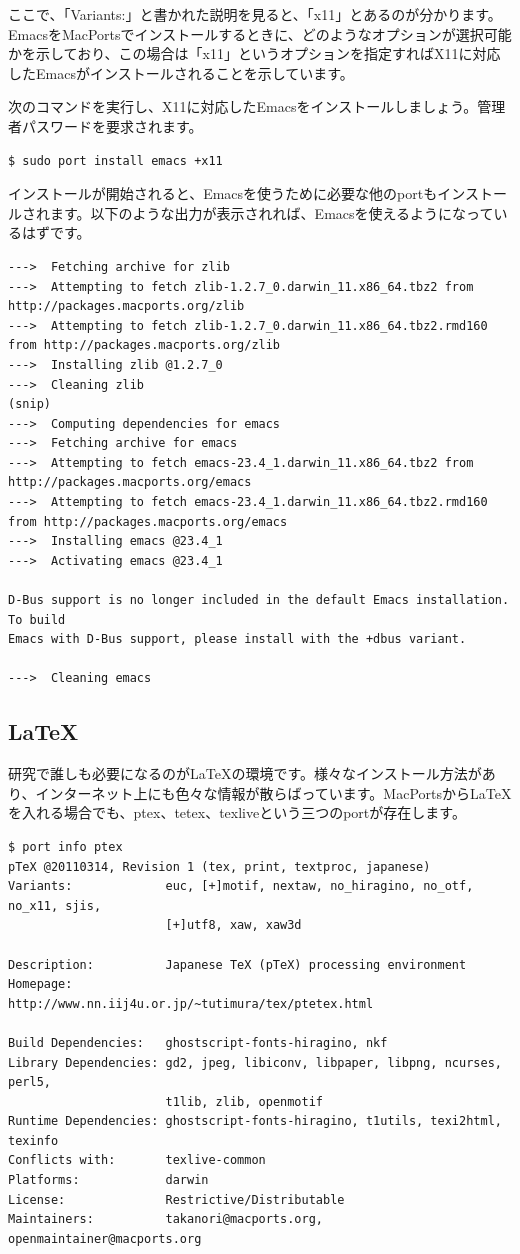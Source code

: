 ここで、「Variants:」と書かれた説明を見ると、「x11」とあるのが分かります。EmacsをMacPortsでインストールするときに、どのようなオプションが選択可能かを示しており、この場合は「x11」というオプションを指定すればX11に対応したEmacsがインストールされることを示しています。

次のコマンドを実行し、X11に対応したEmacsをインストールしましょう。管理者パスワードを要求されます。

\begin{lstlisting}[language=bash]
$ sudo port install emacs +x11
\end{lstlisting}

インストールが開始されると、Emacsを使うために必要な他のportもインストールされます。以下のような出力が表示されれば、Emacsを使えるようになっているはずです。

\begin{lstlisting}
--->  Fetching archive for zlib
--->  Attempting to fetch zlib-1.2.7_0.darwin_11.x86_64.tbz2 from http://packages.macports.org/zlib
--->  Attempting to fetch zlib-1.2.7_0.darwin_11.x86_64.tbz2.rmd160 from http://packages.macports.org/zlib
--->  Installing zlib @1.2.7_0
--->  Cleaning zlib
(snip)
--->  Computing dependencies for emacs
--->  Fetching archive for emacs
--->  Attempting to fetch emacs-23.4_1.darwin_11.x86_64.tbz2 from http://packages.macports.org/emacs
--->  Attempting to fetch emacs-23.4_1.darwin_11.x86_64.tbz2.rmd160 from http://packages.macports.org/emacs
--->  Installing emacs @23.4_1
--->  Activating emacs @23.4_1

D-Bus support is no longer included in the default Emacs installation. To build
Emacs with D-Bus support, please install with the +dbus variant.

--->  Cleaning emacs
\end{lstlisting}

\subsection{\LaTeX}

研究で誰しも必要になるのが\LaTeX{}の環境です。様々なインストール方法があり、インターネット上にも色々な情報が散らばっています。MacPortsから\LaTeX{}を入れる場合でも、ptex、tetex、texliveという三つのportが存在します。

\begin{lstlisting}
$ port info ptex   
pTeX @20110314, Revision 1 (tex, print, textproc, japanese)
Variants:             euc, [+]motif, nextaw, no_hiragino, no_otf, no_x11, sjis,
                      [+]utf8, xaw, xaw3d

Description:          Japanese TeX (pTeX) processing environment
Homepage:             http://www.nn.iij4u.or.jp/~tutimura/tex/ptetex.html

Build Dependencies:   ghostscript-fonts-hiragino, nkf
Library Dependencies: gd2, jpeg, libiconv, libpaper, libpng, ncurses, perl5,
                      t1lib, zlib, openmotif
Runtime Dependencies: ghostscript-fonts-hiragino, t1utils, texi2html, texinfo
Conflicts with:       texlive-common
Platforms:            darwin
License:              Restrictive/Distributable
Maintainers:          takanori@macports.org, openmaintainer@macports.org
\end{lstlisting}

